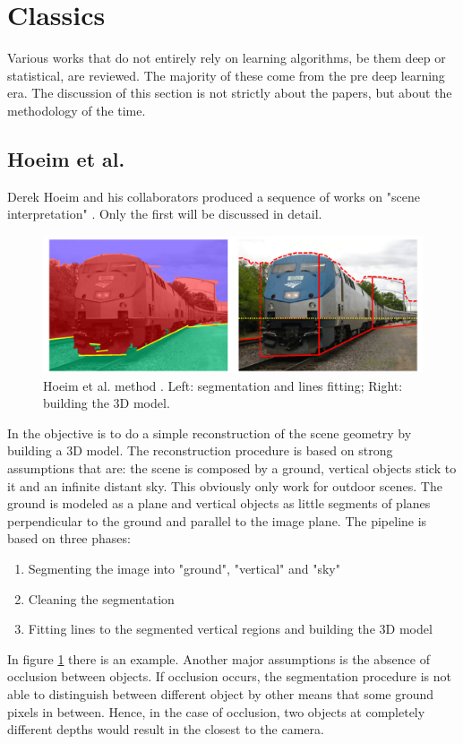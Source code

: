 \section{Classics}
\label{s:classics}
Various works that do not entirely rely on learning algorithms, be them deep or statistical, are reviewed.
The majority of these come from the pre deep learning era.
The discussion of this section is not strictly about the papers, but about the methodology of the time.

\subsection{Hoeim et al.}
Derek Hoeim and his collaborators produced a sequence of works on "scene interpretation" \cite{autopopup1, autopopup2, autopopup3, autopopup4, autopopup5, autopopup6}.
Only the first will be discussed in detail.

\begin{figure}
	\centering
	\includegraphics[scale=0.3]{figs/hoeim}
	\caption{Hoeim et al. method \cite{autopopup1}. Left: segmentation and lines fitting; Right: building the 3D model. \label{fig:hoeim}}
\end{figure}

In \cite{autopopup1} the objective is to do a simple reconstruction of the scene geometry by building a 3D model.
The reconstruction procedure is based on strong assumptions that are: the scene is composed by a ground, vertical objects stick to it and an infinite distant sky.
This obviously only work for outdoor scenes.
The ground is modeled as a plane and vertical objects as little segments of planes perpendicular to the ground and parallel to the image plane.
The pipeline is based on three phases:
\begin{enumerate}
	\item{Segmenting the image into "ground", "vertical" and "sky"}
	\item{Cleaning the segmentation}
	\item{Fitting lines to the segmented vertical regions and building the 3D model}
\end{enumerate}
In figure \ref{fig:hoeim} there is an example.
Another major assumptions is the absence of occlusion between objects.
If occlusion occurs, the segmentation procedure is not able to distinguish between different object by other means that some ground pixels in between.
Hence, in the case of occlusion, two objects at completely different depths would result in the closest to the camera.

